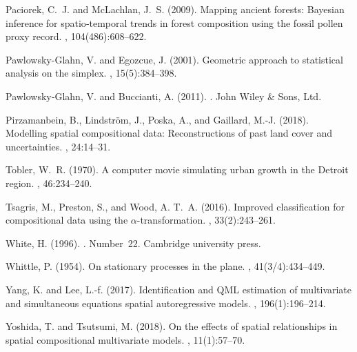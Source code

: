 \documentclass[12pt]{article}
\theoremstyle{plain}
\theoremstyle{definition}
\begin{document}
\begin{thebibliography}{}
	Paciorek, C.~J. and McLachlan, J.~S. (2009).
	\newblock Mapping ancient forests: Bayesian inference for spatio‐temporal
	trends in forest composition using the fossil pollen proxy record.
	,
	104(486):608--622.
	
	{Pawlowsky{-}Glahn}, V. and Egozcue, J. (2001).
	\newblock Geometric approach to statistical analysis on the simplex.
	,
	15(5):384--398.
	
	{Pawlowsky{‐}Glahn}, V. and Buccianti, A. (2011).
	.
	\newblock John Wiley \& Sons, Ltd.
	
	Pirzamanbein, B., Lindstr{\"o}m, J., Poska, A., and Gaillard, M.-J. (2018).
	\newblock Modelling spatial compositional data: Reconstructions of past land
	cover and uncertainties.
	, 24:14--31.
	
	Tobler, W.~R. (1970).
	\newblock A computer movie simulating urban growth in the {Detroit} region.
	, 46:234--240.
	
	Tsagris, M., Preston, S., and Wood, A. T.~A. (2016).
	\newblock Improved classification for compositional data using the
	$\alpha$-transformation.
	, 33(2):243--261.
	
	White, H. (1996).
	.
	\newblock Number~22. Cambridge university press.
	
	Whittle, P. (1954).
	\newblock On stationary processes in the plane.
	, 41(3/4):434--449.
	
	Yang, K. and Lee, L.-f. (2017).
	\newblock Identification and {QML} estimation of multivariate and simultaneous
	equations spatial autoregressive models.
	, 196(1):196--214.
	
	Yoshida, T. and Tsutsumi, M. (2018).
	\newblock On the effects of spatial relationships in spatial compositional
	multivariate models.
	, 11(1):57--70.
	

\end{thebibliography}
\end{document}
